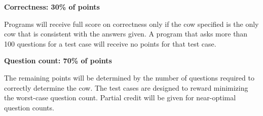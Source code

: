 \textbf{Correctness: 30\% of points}

Programs will receive full score on correctness only if the cow specified is the only cow that is consistent with the answers given. A program that asks more than 100  questions for a test case will receive no points for that test case.

\textbf{Question count: 70\% of points}

The remaining points will be determined by the number of questions required to correctly determine the cow. The test cases are designed to reward minimizing the worst-case question count. Partial credit will be given for near-optimal question counts. 